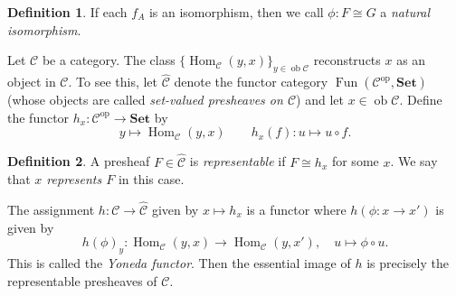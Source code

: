 \documentclass[10pt,letterpaper,cm]{nupset}
\theoremstyle{definition}
\newtheorem{definition}{Definition}[subsection]
\theoremstyle{theorem}
\theoremstyle{remark}
\newcommand{\1}{\mathbf{1}}
\renewcommand{\c}{\mathscr{C}}
\newcommand{\0}{\vec 0}
\DeclareMathOperator{\op}{op}
\DeclareMathOperator{\ob}{ob}
\DeclareMathOperator{\Hom}{Hom}
\DeclareMathOperator{\Fun}{Fun}
\begin{document}
\begin{definition}
If each $f_A$ is an isomorphism, then we call $\phi: F \cong G$ a \textit{natural isomorphism}.
\end{definition}

 Let $\c$ be a category.  The class $\{\Hom_{\c}(y, x)\}_{y\in \ob \c}$ reconstructs $x$ as an object in $\c$. To see this, let $\widehat{\c}$ denote the functor category $\Fun(\c^{\op}, \mathbf{Set})$ (whose objects are called \textit{set-valued presheaves on $\c$})  and let $x \in \ob \c$. Define the functor $h_x : \c^{\op} \to \mathbf{Set}$ by $$y \mapsto \Hom_{\c}(y, x) \quad \quad h_x(f) : u \mapsto u \circ f.$$ 
 
\begin{definition}
A presheaf $F \in \widehat{\c}$ is \textit{representable} if $F \cong h_x$ for some $x$. We say that \textit{$x$ represents $F$} in this case.
\end{definition}

The assignment $h: \c \to \widehat{\c}$ given by $x \mapsto h_x$ is a functor where $h(\phi : x \to x')$ is given by $$h(\phi)_y : \Hom_{\c}(y, x) \to \Hom_{\c}(y, x'), \quad u \mapsto \phi \circ u.$$ This is called the \textit{Yoneda functor}. Then the essential image of $h$ is precisely the representable presheaves of $\c$.
\end{document}

